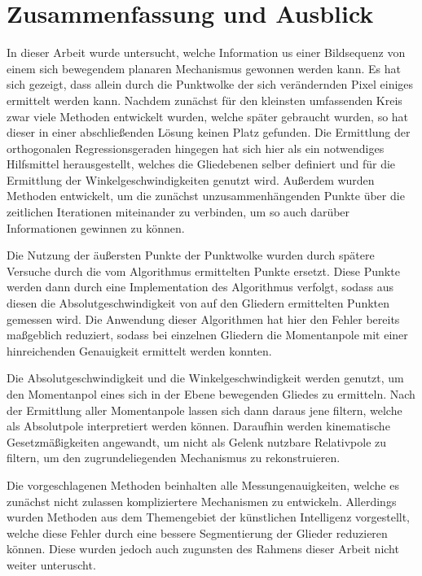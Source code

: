 
\chapter{Zusammenfassung und Ausblick} \label{ch:zusammenfassung_ausblick}


In dieser Arbeit wurde untersucht, welche Information us einer Bildsequenz von einem sich bewegendem planaren Mechanismus gewonnen werden kann.
Es hat sich gezeigt, dass allein durch die Punktwolke der sich verändernden Pixel einiges ermittelt werden kann.
Nachdem zunächst für den kleinsten umfassenden Kreis zwar viele Methoden entwickelt wurden, welche später gebraucht wurden, so hat dieser in einer abschlie{\ss}enden Lösung keinen Platz gefunden.
Die Ermittlung der orthogonalen Regressionsgeraden hingegen hat sich hier als ein notwendiges Hilfsmittel herausgestellt, welches die Gliedebenen selber definiert und für die Ermittlung der Winkelgeschwindigkeiten genutzt wird.
Au{\ss}erdem wurden Methoden entwickelt, um die zunächst unzusammenhängenden Punkte über die zeitlichen Iterationen miteinander zu verbinden, um so auch darüber Informationen gewinnen zu können.

Die Nutzung der äu{\ss}ersten Punkte der Punktwolke wurden durch spätere Versuche durch die vom  Algorithmus ermittelten Punkte ersetzt.
Diese Punkte werden dann durch eine Implementation des  Algorithmus verfolgt, sodass aus diesen die Absolutgeschwindigkeit von auf den Gliedern ermittelten Punkten gemessen wird.
Die Anwendung dieser Algorithmen hat hier den Fehler bereits ma{\ss}geblich reduziert, sodass bei einzelnen Gliedern die Momentanpole mit einer hinreichenden Genauigkeit ermittelt werden konnten.

Die Absolutgeschwindigkeit und die Winkelgeschwindigkeit werden genutzt, um den Momentanpol eines sich in der Ebene bewegenden Gliedes zu ermitteln.
Nach der Ermittlung aller Momentanpole lassen sich dann daraus jene filtern, welche als Absolutpole interpretiert werden können.
Daraufhin werden kinematische Gesetzmä{\ss}igkeiten angewandt, um nicht als Gelenk nutzbare Relativpole zu filtern, um den zugrundeliegenden Mechanismus zu rekonstruieren.

Die vorgeschlagenen Methoden beinhalten alle Messungenauigkeiten, welche es zunächst nicht zulassen kompliziertere Mechanismen zu entwickeln.
Allerdings wurden Methoden aus dem Themengebiet der künstlichen Intelligenz vorgestellt, welche diese Fehler durch eine bessere Segmentierung der Glieder reduzieren können.
Diese wurden jedoch auch zugunsten des Rahmens dieser Arbeit nicht weiter unteruscht.

